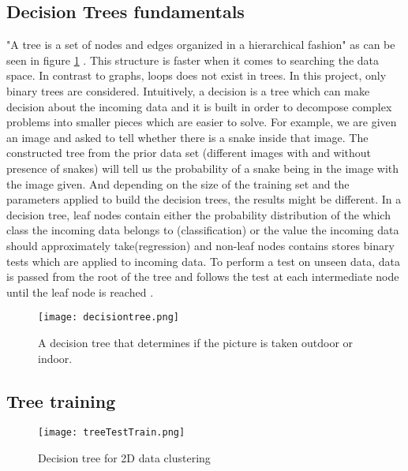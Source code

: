 \subsection{Decision Trees fundamentals}
\label{subsec:Dtree}
"A tree is a set of nodes and edges organized in a hierarchical fashion" as can be seen in figure \ref{fig:decisiontree} \cite{DFMS,2dGFRF}. This structure is faster when it comes to searching the data space.  In contrast to graphs, loops does not exist in trees. In this project, only binary trees are considered. Intuitively, a decision is a tree which can make decision about the incoming data and it is built  in order to decompose complex problems into smaller pieces which are easier to solve. For example, we are given an image and asked to tell whether there is a snake inside that image. The constructed tree from the prior data set (different images with and without presence of snakes) will tell us the probability of a snake being in the image with the image given. And depending on the size of the training set and the parameters applied to build the decision trees, the results might be different. In a decision tree, leaf nodes contain either the probability distribution of the which class the incoming data belongs to (classification) or the value the incoming data should approximately take(regression) and non-leaf nodes contains stores binary tests which are applied to incoming data. To perform a test on unseen data, data is passed from the root of the tree and follows the test at each intermediate node until the leaf node is reached \cite{MVDT,DTBBR,IIDT}.

\begin{figure}
	\centering
	\texttt{[image: decisiontree.png]}
	\caption[decision tree]{\label{fig:decisiontree}} A decision tree that determines if the picture is taken outdoor or indoor. \cite{DFMS} 
\end{figure}

\subsection{Tree training}
\label{subsec:TTraining}

\begin{figure}
	\centering
	\texttt{[image: treeTestTrain.png]}
	\caption[Decision tree for 2D data]{\label{fig:treetesttrain}} Decision tree for 2D data clustering\cite{DFMS} 
\end{figure}

